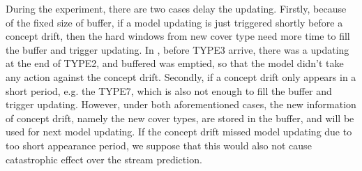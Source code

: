 During the experiment, there are two cases delay the updating. Firstly, because of the fixed size of buffer, if a model updating is just triggered shortly before a concept drift, then the hard windows from new cover type need more time to fill the buffer and trigger updating. In , before TYPE3 arrive, there was a updating at the end of TYPE2, and buffered was emptied, so that the model didn’t take any action against the concept drift. Secondly, if a concept drift only appears in a short period, e.g. the TYPE7, which is also not enough to fill the buffer and trigger updating. However, under both aforementioned cases, the new information of concept drift, namely the new cover types, are stored in the buffer, and will be used for next model updating. If the concept drift missed model updating due to too short appearance period, we suppose that this would also not cause catastrophic effect over the stream prediction.\\









